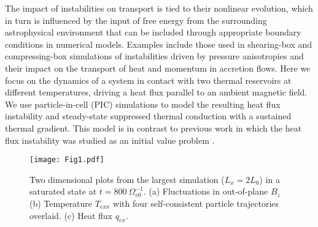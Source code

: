 \documentclass[%
 reprint,
superscriptaddress,
 amsmath,amssymb,
 aps,
]{revtex4-1}
\begin{document}
The impact of instabilities on transport is tied to their nonlinear
evolution, which in turn is influenced by the input of free energy
from the surrounding astrophysical environment that can be included
through appropriate boundary conditions in numerical models. Examples
include those used in shearing-box \cite{Kunz2016,Riquelme2016} and
compressing-box \cite{Sironi2015a,Sironi2015b} simulations of
instabilities driven by pressure anisotropies and their impact on the
transport of heat and momentum in accretion flows. Here we focus
on the dynamics of a system in contact with two thermal
reservoirs at different temperatures, driving a heat flux parallel to
an ambient magnetic field. We use particle-in-cell (PIC) simulations
to model the resulting heat flux instability and steady-state
suppressed thermal conduction with a sustained thermal gradient. This
model is in contrast to previous work in which the heat flux
instability was studied as an initial value problem
\cite{Roberg-Clark2016}.

\begin{figure*}
    \centering
    \texttt{[image: Fig1.pdf]}
    \caption{Two dimensional plots from the largest simulation ($L_{x}=2L_{0}$) in a saturated state at $t=800 \: \Omega_{e0}^{-1}$. (a) Fluctuations in out-of-plane $B_{z}$ (b) Temperature $T_{exx}$ with four self-consistent particle trajectories overlaid. (c) Heat flux $q_{ex}$. }
    \label{fig:1}
\end{figure*}
\end{document}

